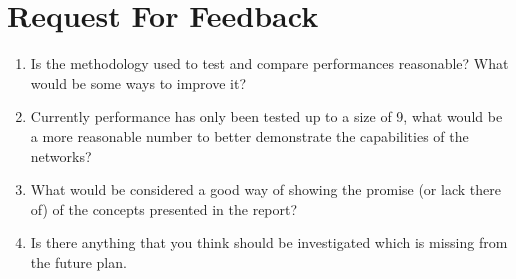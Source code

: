 \chapter{Request For Feedback}\label{C:requestforfeedback}
\begin{enumerate}
	\item Is the methodology used to test and compare performances reasonable? What would be some ways to improve it?
	\item Currently performance has only been tested up to a size of 9, what would be a more reasonable number to better demonstrate the capabilities of the networks?
	\item What would be considered a good way of showing the promise (or lack there of) of the concepts presented in the report?
	\item Is there anything that you think should be investigated which is missing from the future plan.
\end{enumerate}